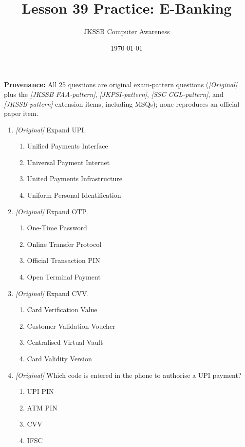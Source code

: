 \documentclass[11pt]{article}
\title{Lesson 39 Practice: E-Banking}
\author{JKSSB Computer Awareness}
\date{\today}
\begin{document}
\maketitle
\noindent\textbf{Provenance:} All 25 questions are original exam-pattern questions (\textit{[Original]} plus the \textit{[JKSSB FAA-pattern]}, \textit{[JKPSI-pattern]}, \textit{[SSC CGL-pattern]}, and \textit{[JKSSB-pattern]} extension items, including MSQs); none reproduces an official paper item.

\begin{enumerate}[label=\textbf{Q\arabic*.}, leftmargin=*]
\item \textit{[Original]} Expand UPI.
  \begin{enumerate}[label=\Alph*.]
    \item Unified Payments Interface
    \item Universal Payment Internet
    \item United Payments Infrastructure
    \item Uniform Personal Identification
  \end{enumerate}
\item \textit{[Original]} Expand OTP.
  \begin{enumerate}[label=\Alph*.]
    \item One-Time Password
    \item Online Transfer Protocol
    \item Official Transaction PIN
    \item Open Terminal Payment
  \end{enumerate}
\item \textit{[Original]} Expand CVV.
  \begin{enumerate}[label=\Alph*.]
    \item Card Verification Value
    \item Customer Validation Voucher
    \item Centralised Virtual Vault
    \item Card Validity Version
  \end{enumerate}
\item \textit{[Original]} Which code is entered in the phone to authorise a
  UPI payment?
  \begin{enumerate}[label=\Alph*.]
    \item UPI PIN
    \item ATM PIN
    \item CVV
    \item IFSC
  \end{enumerate}

\end{enumerate}
\end{document}
